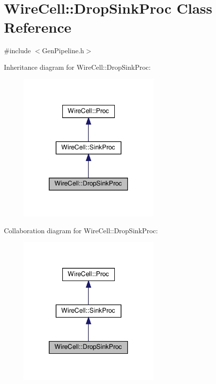 \hypertarget{class_wire_cell_1_1_drop_sink_proc}{}\section{Wire\+Cell\+:\+:Drop\+Sink\+Proc Class Reference}
\label{class_wire_cell_1_1_drop_sink_proc}


{\ttfamily \#include $<$Gen\+Pipeline.\+h$>$}



Inheritance diagram for Wire\+Cell\+:\+:Drop\+Sink\+Proc\+:
\nopagebreak
\begin{figure}[H]
\begin{center}
\leavevmode
\includegraphics[width=201pt]{class_wire_cell_1_1_drop_sink_proc__inherit__graph}
\end{center}
\end{figure}


Collaboration diagram for Wire\+Cell\+:\+:Drop\+Sink\+Proc\+:
\nopagebreak
\begin{figure}[H]
\begin{center}
\leavevmode
\includegraphics[width=201pt]{class_wire_cell_1_1_drop_sink_proc__coll__graph}
\end{center}
\end{figure}
